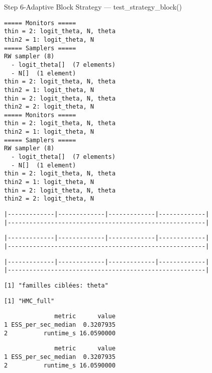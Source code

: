 \documentclass[
  10pt,
  ignorenonframetext,
  aspectratio=169]{beamer}
\begin{document}
\begin{frame}[fragile]{Step 6-Adaptive Block Strategy ---
test\_strategy\_block()}
\label{step-6-adaptive-block-strategy-test_strategy_block}
\begin{lstlisting}
===== Monitors =====
thin = 2: logit_theta, N, theta
thin2 = 1: logit_theta, N
===== Samplers =====
RW sampler (8)
  - logit_theta[]  (7 elements)
  - N[]  (1 element)
thin = 2: logit_theta, N, theta
thin2 = 1: logit_theta, N
thin = 2: logit_theta, N, theta
thin2 = 2: logit_theta, N
===== Monitors =====
thin = 2: logit_theta, N, theta
thin2 = 1: logit_theta, N
===== Samplers =====
RW sampler (8)
  - logit_theta[]  (7 elements)
  - N[]  (1 element)
thin = 2: logit_theta, N, theta
thin2 = 1: logit_theta, N
thin = 2: logit_theta, N, theta
thin2 = 2: logit_theta, N
\end{lstlisting}

\begin{lstlisting}
|-------------|-------------|-------------|-------------|
|-------------------------------------------------------|
\end{lstlisting}

\begin{lstlisting}
|-------------|-------------|-------------|-------------|
|-------------------------------------------------------|
\end{lstlisting}

\begin{lstlisting}
|-------------|-------------|-------------|-------------|
|-------------------------------------------------------|
\end{lstlisting}

\begin{lstlisting}
[1] "familles ciblées: theta"
\end{lstlisting}

\begin{lstlisting}
[1] "HMC_full"
\end{lstlisting}

\begin{lstlisting}
              metric      value
1 ESS_per_sec_median  0.3207935
2          runtime_s 16.0590000
\end{lstlisting}

\begin{lstlisting}
              metric      value
1 ESS_per_sec_median  0.3207935
2          runtime_s 16.0590000
\end{lstlisting}
\end{frame}
\end{document}
